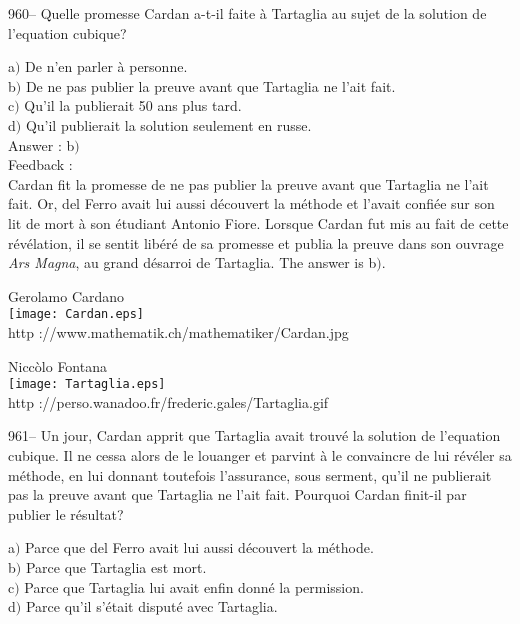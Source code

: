 \documentclass[letterpaper, 12pt]{article}
\begin{document}
960-- Quelle promesse Cardan a-t-il faite \`a Tartaglia au sujet de
la solution de l'equation cubique?

a$)$ De n'en parler \`a personne.\\
b$)$ De ne pas publier la preuve avant que Tartaglia ne l'ait fait.  \\
c$)$ Qu'il la publierait 50 ans plus tard.  \\
d$)$ Qu'il publierait la solution seulement en russe. \\

Answer : b$)$\\

Feedback :\\
Cardan fit la promesse de ne pas publier la preuve avant que
Tartaglia ne l'ait fait. Or, del Ferro avait lui aussi d\'ecouvert
la m\'ethode et l'avait confi\'ee sur son lit de mort \`a son
\'etudiant Antonio Fiore. Lorsque Cardan fut mis au fait de cette
r\'ev\'elation,
il se sentit lib\'er\'e de sa promesse et publia la preuve dans son ouvrage
{\sl Ars Magna}, au grand d\'esarroi de Tartaglia. The answer is b$)$.\\
        \begin{center}
        Gerolamo Cardano\\
    \texttt{[image: Cardan.eps]}\\
        {\footnotesize http ://www.mathematik.ch/mathematiker/Cardan.jpg}
    \end{center}

        \begin{center}
        Nicc\`olo Fontana\\
    \texttt{[image: Tartaglia.eps]}\\
        {\footnotesize http
://perso.wanadoo.fr/frederic.gales/Tartaglia.gif}
    \end{center}

961-- Un jour, Cardan apprit que Tartaglia avait trouv\'e la
solution de l'equation cubique. Il ne cessa alors de le louanger
et parvint \`a le convaincre de lui r\'ev\'eler sa m\'ethode, en lui
donnant toutefois l'assurance, sous serment, qu'il ne publierait pas
la preuve avant que Tartaglia ne l'ait fait. Pourquoi Cardan
finit-il par publier le r\'esultat?

a$)$ Parce que del Ferro avait lui aussi d\'ecouvert la m\'ethode. \\
b$)$ Parce que Tartaglia est mort.  \\
c$)$ Parce que Tartaglia lui avait enfin donn\'e la permission.  \\
d$)$ Parce qu'il s'\'etait disput\'e avec Tartaglia. \\
\end{document}
